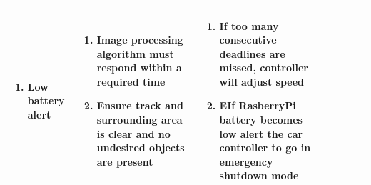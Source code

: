 \documentclass [10pt]{article}
\begin{document}
{{\begin{minipage}{\textwidth}
\begin{longtable}{ |p{ }  | p{ } |  p{ } |  p{ } | p{ } | p{ } |  p{ }|}
\begin{minipage}{.18\columnwidth}
\begin{enumerate}
                    \item Low battery alert \vspace {1mm}
                \end{enumerate}
        \end{minipage}
    & \cellcolor{tableCell}\begin{minipage}{.23\columnwidth} 
                \vspace{1mm}
                \begin{enumerate}
                    \item Image processing algorithm must respond within a required time
                    \item Ensure track and surrounding area is clear and no undesired objects are present\vspace {1mm}
                \end{enumerate}
        \end{minipage}
    
    
    & \cellcolor{tableCell}\begin{minipage}{.24 \columnwidth} 
                \vspace{1mm}
                \begin{enumerate}
                    \item If too many consecutive deadlines are missed, controller will adjust speed
                    \item EIf RasberryPi battery becomes low alert the car controller to go in emergency shutdown mode\vspace {1mm}
                \end{enumerate}
        \end{minipage} \\ \hline
   
    
   
    
 
    
    
   
    
     
    \end{longtable}
    
    
    
    \end{minipage}}}
    
\end{document}
